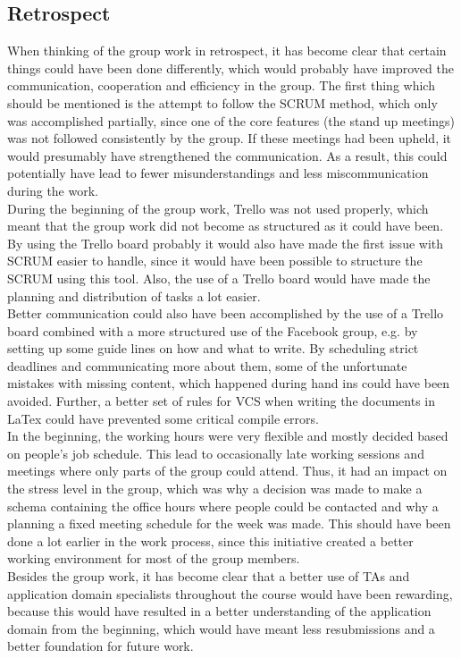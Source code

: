\subsection{Retrospect}

When thinking of the group work in retrospect, it has become clear that certain things could have been done differently, which would probably have improved the communication, cooperation and efficiency in the group.
The first thing which should be mentioned is the attempt to follow the SCRUM method, which only was accomplished partially, since one of the core features (the stand up meetings) was not followed consistently by the group. If these meetings had been upheld, it would presumably have strengthened the communication. As a result, this could potentially have lead to fewer misunderstandings and less miscommunication during the work.
\\
During the beginning of the group work, Trello was not used properly, which meant that the group work did not become as structured as it could have been. By using the Trello board probably it would also have made the first issue with SCRUM easier to handle, since it would have been possible to structure the SCRUM using this tool. Also, the use of a Trello board would have made the planning and distribution of tasks a lot easier.
\\
Better communication could also have been accomplished by the use of a Trello board combined with a more structured use of the Facebook group, e.g. by setting up some guide lines on how and what to write. By scheduling strict deadlines and communicating more about them, some of the unfortunate mistakes with missing content, which happened during hand ins could have been avoided. Further, a better set of rules for VCS when writing the documents in LaTex could have prevented some critical compile errors.
\\
In the beginning, the working hours were very flexible and mostly decided based on people's job schedule. This lead to occasionally late working sessions and meetings where only parts of the group could attend. Thus, it had an impact on the stress level in the group, which was why a decision was made to make a schema containing the office hours where people could be contacted and why a planning a fixed meeting schedule for the week was made. This should have been done a lot earlier in the work process, since this initiative created a better working environment for most of the group members.
\\
Besides the group work, it has become clear that a better use of TAs and application domain specialists throughout the course would have been rewarding, because this would have resulted in a better understanding of the application domain from the beginning, which would have meant less resubmissions and a better foundation for future work. 
